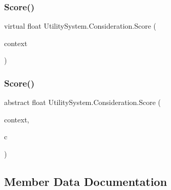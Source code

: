 \subsubsection{\texorpdfstring{Score()}{Score()}\hspace{0.1cm}{\footnotesize\ttfamily [1/2]}}
{\footnotesize\ttfamily virtual float Utility\+System.\+Consideration.\+Score (\begin{DoxyParamCaption}\item[{\mbox{\hyperlink{class_utility_system_1_1_decision_context}{Decision\+Context}}}]{context }\end{DoxyParamCaption})\hspace{0.3cm}{\ttfamily [virtual]}}

\mbox{\label{class_utility_system_1_1_consideration_a1340c371b0e917253e906b48b5c3b187}} 
\subsubsection{\texorpdfstring{Score()}{Score()}\hspace{0.1cm}{\footnotesize\ttfamily [2/2]}}
{\footnotesize\ttfamily abstract float Utility\+System.\+Consideration.\+Score (\begin{DoxyParamCaption}\item[{\mbox{\hyperlink{class_utility_system_1_1_decision_context}{Decision\+Context}}}]{context,  }\item[{\mbox{\hyperlink{class_utility_system_1_1_consideration}{Consideration}}}]{c }\end{DoxyParamCaption})\hspace{0.3cm}{\ttfamily [pure virtual]}}



\subsection{Member Data Documentation}
\mbox{\label{class_utility_system_1_1_consideration_aea5bafaa7a2cb6b8d8dda059e7cbc452}} 
